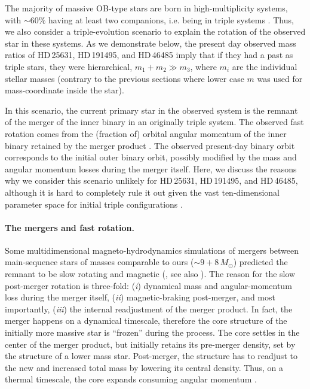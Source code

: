 \documentclass{aa}
\begin{document}
The majority of massive OB-type stars are born in high-multiplicity
systems, with $\sim60\%$ having at least two companions, i.e. being in triple systems
\citep[e.g.,][]{moe_2017, Offner_2022}. Thus, we also consider a
triple-evolution scenario to explain the rotation of the observed star
in these systems. As we demonstrate below, the present day observed
mass ratios of HD\,25631, HD\,191495, and HD\,46485 imply that if they
had a past as triple stars, they were hierarchical, $m_1+m_2 \gg m_3$,
where $m_i$ are the individual stellar masses (contrary to the previous
sections where lower case $m$ was used for mass-coordinate inside the star).

In this scenario, the current primary star in the observed system is
the remnant of the merger of the inner binary in an originally triple
system. The observed fast rotation comes from the (fraction of)
orbital angular momentum of the inner binary retained by the merger
product \citep[e.g.,][]{deMink_2014}. The observed present-day binary
orbit corresponds to the initial outer binary orbit, possibly modified
by the mass and angular momentum losses during the merger itself.
Here, we discuss the reasons why we consider this scenario unlikely
for HD\,25631, HD\,191495, and HD\,46485, although it is hard to
completely rule it out given the vast ten-dimensional parameter space
for initial triple configurations \citep[e.g.,][]{toonen:16}.
\paragraph{The mergers and fast rotation.}
Some multidimensional magneto-hydrodynamics simulations of mergers between
main-sequence stars of masses comparable to ours ($\sim 9+8\,M_\odot$)
predicted the remnant to be slow rotating and magnetic
(\citealt{schneider:16, schneider:19, schneider:20}, see also
\citealt{wang:20}). The reason for the slow post-merger rotation is
three-fold: (\emph{i}) dynamical mass and angular-momentum loss during
the merger itself, (\emph{ii}) magnetic-braking post-merger, and most
importantly, (\emph{iii}) the internal readjustment of the merger
product. In fact, the merger happens on a dynamical timescale,
therefore the core structure of the initially more massive star is
``frozen'' during the process. The core settles in the center of the
merger product, but initially retains its pre-merger density, set by
the structure of a lower mass star. Post-merger, the structure has to readjust to the new and increased total mass by lowering its
central density. Thus, on a thermal timescale, the core expands
consuming angular momentum \citep{schneider:19, schneider:20}.
\end{document}
